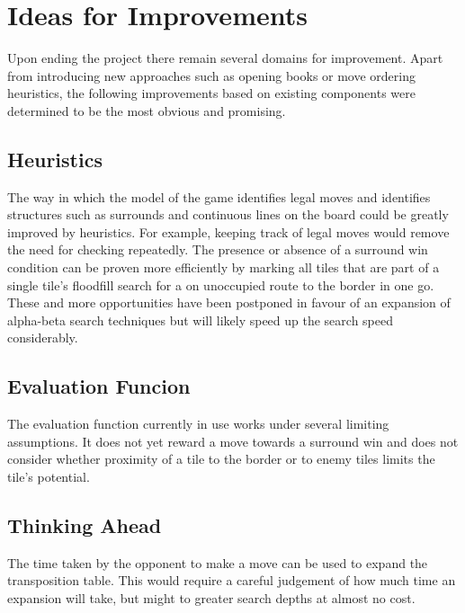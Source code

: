 \section{Ideas for Improvements}
Upon ending the project there remain several domains for improvement. Apart from introducing new approaches such as opening books or move ordering heuristics, the following improvements based on existing components were determined to be the most obvious and promising.

\subsection{Heuristics}
The way in which the model of the game identifies legal moves and identifies structures such as surrounds and continuous lines on the board could be greatly improved by heuristics. For example, keeping track of legal moves would remove the need for checking repeatedly. The presence or absence of a surround win condition can be proven more efficiently by marking all tiles that are part of a single tile's floodfill search for a on unoccupied route to the border in one go. These and more opportunities have been postponed in favour of an expansion of alpha-beta search techniques but will likely speed up the search speed considerably.

\subsection{Evaluation Funcion}
The evaluation function currently in use works under several limiting assumptions. It does not yet reward a move towards a surround win and does not consider whether proximity of a tile to the border or to enemy tiles limits the tile's potential.

\subsection{Thinking Ahead}
The time taken by the opponent to make a move can be used to expand the transposition table. This would require a careful judgement of how much time an expansion will take, but might to greater search depths at almost no cost.